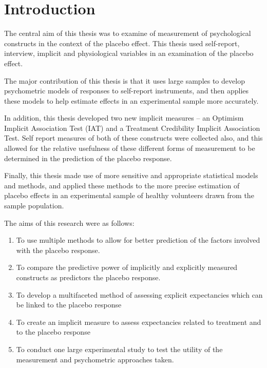 \chapter{Introduction}


The central aim of this thesis was to examine of measurement of psychological constructs in the context of the placebo effect. This thesis used self-report, interview, implicit and physiological variables in an examination of the placebo effect. 


The major contribution of this thesis is that it uses large samples to develop psychometric models of responses to self-report instruments, and then applies these models to help estimate effects in an experimental sample more accurately. 

In addition, this thesis developed two new implicit measures -- an Optimism Implicit Association Test (IAT) and a Treatment Credibility Implicit Association Test. Self report measures of both of these constructs were collected also, and this allowed for the relative usefulness of these different forms of measurement to be determined in the prediction of the placebo response. 

Finally, this thesis  made use of more sensitive and appropriate statistical models and methods, and applied these methods to the more precise estimation of placebo effects in an experimental sample of healthy volunteers drawn from the sample population. 


The aims of this research were as follows:


\begin{enumerate}

\item To use multiple methods to allow for better prediction of the factors involved with the placebo response. 

\item To compare the predictive power of implicitly and explicitly measured constructs as predictors the placebo response. 

\item To develop a multifaceted method of assessing explicit expectancies which can be linked to the placebo response

\item To create an implicit measure to assess expectancies related to treatment and to the placebo response

\item To conduct one large experimental study to test the utility of the measurement and psychometric approaches taken. 

\end{enumerate}

